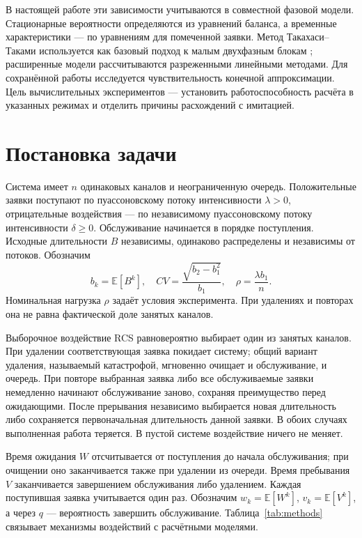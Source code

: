 \documentclass[a4paper,12pt]{article}
\begin{document}
В настоящей работе эти зависимости учитываются в совместной фазовой модели. Стационарные вероятности определяются из уравнений баланса, а временные характеристики --- по уравнениям для помеченной заявки. Метод Такахаси--Таками используется как базовый подход к малым двухфазным блокам \cite{takahashi1976,ryzhikov2018ru}; расширенные модели рассчитываются разреженными линейными методами. Для сохранённой работы исследуется чувствительность конечной аппроксимации. Цель вычислительных экспериментов --- установить работоспособность расчёта в указанных режимах и отделить причины расхождений с имитацией.

\section{Постановка задачи}
Система имеет \(n\) одинаковых каналов и неограниченную очередь. Положительные заявки поступают по пуассоновскому потоку интенсивности \(\lambda>0\), отрицательные воздействия --- по независимому пуассоновскому потоку интенсивности \(\delta\ge0\). Обслуживание начинается в порядке поступления. Исходные длительности \(B\) независимы, одинаково распределены и независимы от потоков. Обозначим
\[
b_k=\mathbb E[B^k],\quad CV=\frac{\sqrt{b_2-b_1^2}}{b_1},\quad \rho=\frac{\lambda b_1}{n}.
\]
Номинальная нагрузка \(\rho\) задаёт условия эксперимента. При удалениях и повторах она не равна фактической доле занятых каналов.

Выборочное воздействие RCS равновероятно выбирает один из занятых каналов. При удалении соответствующая заявка покидает систему; общий вариант удаления, называемый катастрофой, мгновенно очищает и обслуживание, и очередь. При повторе выбранная заявка либо все обслуживаемые заявки немедленно начинают обслуживание заново, сохраняя преимущество перед ожидающими. После прерывания независимо выбирается новая длительность либо сохраняется первоначальная длительность данной заявки. В обоих случаях выполненная работа теряется. В пустой системе воздействие ничего не меняет.

Время ожидания \(W\) отсчитывается от поступления до начала обслуживания; при очищении оно заканчивается также при удалении из очереди. Время пребывания \(V\) заканчивается завершением обслуживания либо удалением. Каждая поступившая заявка учитывается один раз. Обозначим \(w_k=\mathbb E[W^k]\), \(v_k=\mathbb E[V^k]\), а через \(q\) --- вероятность завершить обслуживание. Таблица~\ref{tab:methods} связывает механизмы воздействий с расчётными моделями.
\end{document}
